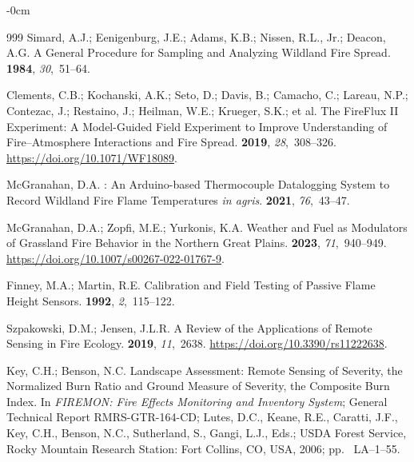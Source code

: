\documentclass[fire,article,accept,oneauthor,pdftex]{Definitions/mdpi}
\begin{document}
\begin{adjustwidth}{-\extralength}{0cm}
\begin{thebibliography}{999}
Simard, A.J.; Eenigenburg, J.E.; Adams, K.B.; Nissen, R.L., Jr.; Deacon, A.G.
\newblock A General Procedure for Sampling and Analyzing Wildland Fire Spread.
 {\bf 1984}, {\em 30},~51--64.

Clements, C.B.; Kochanski, A.K.; Seto, D.; Davis, B.; Camacho, C.; Lareau,
  N.P.; Contezac, J.; Restaino, J.; Heilman, W.E.; Krueger, S.K.; et al.
\newblock The {{FireFlux II}} Experiment: A Model-Guided Field Experiment to
  Improve Understanding of Fire--Atmosphere Interactions and Fire Spread.
 {\bf 2019}, {\em
  28},~308--326.
\newblock
  \url{https://doi.org/10.1071/WF18089}.

McGranahan, D.A.
: {{An Arduino-based}} Thermocouple Datalogging
  System to Record Wildland Fire Flame Temperatures {{{\emph{in agris}}}.}
 {\bf 2021}, {\em 76},~43--47.

McGranahan, D.A.; Zopfi, M.E.; Yurkonis, K.A.
\newblock Weather and Fuel as Modulators of Grassland Fire Behavior in the
  Northern {{Great Plains}}.
 {\bf 2023}, {\em 71},~940--949.
\newblock
  \url{https://doi.org/10.1007/s00267-022-01767-9}.

Finney, M.A.; Martin, R.E.
\newblock Calibration and Field Testing of Passive Flame Height Sensors.
 {\bf 1992}, {\em
  2},~115--122.

Szpakowski, D.M.; Jensen, J.L.R.
\newblock A {{Review}} of the {{Applications}} of {{Remote Sensing}} in {{Fire
  Ecology}}.
 {\bf 2019}, {\em 11},~2638.
\newblock
  \url{https://doi.org/10.3390/rs11222638}.

Key, C.H.; Benson, N.C.
\newblock Landscape Assessment: Remote Sensing of Severity, the Normalized Burn
  Ratio and Ground Measure of Severity, the Composite Burn Index. In {\em
  {{FIREMON}}: {{Fire}} Effects Monitoring and Inventory System}; General Technical Report RMRS-GTR-164-CD; Lutes, D.C., Keane, R.E., Caratti,
  J.F., Key, C.H., Benson, N.C., Sutherland, S., Gangi, L.J., Eds.; USDA Forest
  Service, Rocky Mountain Research Station: Fort Collins, CO, USA, 2006; pp.~ LA--1--55. %



\end{thebibliography}
\end{adjustwidth}
\end{document}
